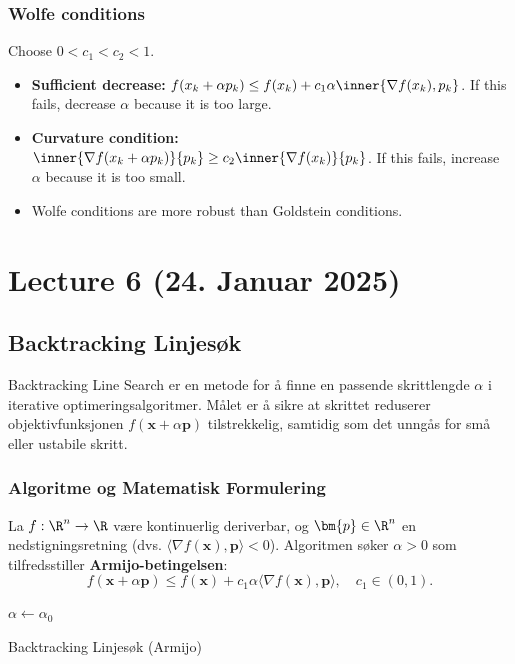 \subsubsection*{Wolfe conditions}
Choose  \(0 < c_1 < c_2 < 1\).
\begin{itemize}
	\item \textbf{Sufficient decrease:}  \(f(x_k + \alpha p_k) \leq f(x_k) + c_1 \alpha \inner{\nabla f(x_k), p_k}\). If this fails, decrease  \(\alpha\) because it is too large.
	\item \textbf{Curvature condition:}  \(\inner{\nabla f(x_k + \alpha p_k)}{p_k} \geq c_2 \inner{\nabla f(x_k)}{p_k}\). If this fails, increase  \(\alpha\) because it is too small.
	\item Wolfe conditions are more robust than Goldstein conditions.
\end{itemize}

\section{Lecture 6 (24. Januar 2025)}
\subsection*{Backtracking Linjesøk}
Backtracking Line Search er en metode for å finne en passende skrittlengde \( \alpha \) i iterative optimeringsalgoritmer. Målet er å sikre at skrittet reduserer objektivfunksjonen \( f(\bm{x} + \alpha \bm{p}) \) tilstrekkelig, samtidig som det unngås for små eller ustabile skritt.

\subsubsection*{Algoritme og Matematisk Formulering}
La \( f: \R^n \to \R \) være kontinuerlig deriverbar, og \( \bm{p} \in \R^n \) en nedstigningsretning (dvs. \( \langle \nabla f(\bm{x}), \bm{p} \rangle < 0 \)). Algoritmen søker \( \alpha > 0 \) som tilfredsstiller \textbf{Armijo-betingelsen}:
\[
	f(\bm{x} + \alpha \bm{p}) \leq f(\bm{x}) + c_1 \alpha \langle \nabla f(\bm{x}), \bm{p} \rangle, \quad c_1 \in (0, 1).
\]

\begin{algorithm}[H]
	\SetAlgoLined
	\DontPrintSemicolon
	\KwOut{ \(\alpha\)}
	\(\alpha \leftarrow \alpha_0\)\;
	\Return{ \(\alpha\)}
	\caption{Backtracking Linjesøk (Armijo)}
\end{algorithm}

